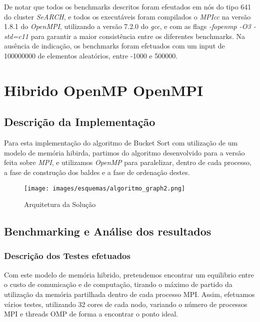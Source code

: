 \documentclass[a4paper]{report}
\begin{document}
De notar que todos os benchmarks descritos foram efeutados em nós do tipo 641 do
cluster \textit{SeARCH}, e todos os executáveis foram compilados o
\textit{MPIcc} na versão 1.8.1 do \textit{OpenMPI}, utilizando a versão
7.2.0 do \textit{gcc}, e com as flags \textit{-fopenmp -O3 -std=c11} para garantir
a maior consistência entre os diferentes benchmarks. Na
ausência de indicação, os benchmarks foram efetuados com um input de 100000000
de elementos aleatórios, entre -1000 e 500000.

\chapter{Hibrido OpenMP OpenMPI} \label{chap:ompi}

\section{Descrição da Implementação}
Para esta implementação do algoritmo de Bucket Sort com utilização de um modelo
de memória hibirda, partimos do algoritmo desenvolvido para a versão feita sobre
\textit{MPI}, e utilizamos \textit{OpenMP} para paralelizar, dentro de cada
processo, a fase de construção dos baldes e a fase de ordenação destes.

\begin{figure}[h]
    \centering
    \texttt{[image: images/esquemas/algoritmo\_graph2.png]}
    \caption{Arquitetura da Solução}
\end{figure}
\pagebreak

\section{Benchmarking e Análise dos resultados}

\subsection{Descrição dos Testes efetuados}
Com este modelo de memória hibrido, pretendemos encontrar um equilibrio entre o
custo de comunicação e de computação, tirando o máximo de partido da utilização
da memória partilhada dentro de cada processo MPI. Assim, efetuamos vários
testes, utilizando 32 cores de cada nodo, variando o número de processos MPI e
threads OMP de forma a encontrar o ponto ideal.
\end{document}
